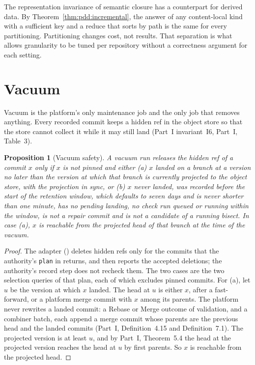\documentclass[11pt,letterpaper]{article}
\newtheorem{proposition}[theorem]{Proposition}
\theoremstyle{definition}
\theoremstyle{remark}
\DeclareRobustCommand{\code}[1]{{\def\_{\textunderscore\allowbreak}\texttt{#1}}}
\begin{document}
The representation invariance of semantic closure has a counterpart for derived data. By Theorem~\ref{thm:pdd:incremental}, the answer of any content-local kind with a sufficient key and a reduce that sorts by path is the same for every partitioning. Partitioning changes cost, not results. That separation is what allows granularity to be tuned per repository without a correctness argument for each setting.

\section{Vacuum}
\label{sec:pdd:vacuum}

Vacuum is the platform's only maintenance job and the only job that removes anything. Every recorded commit keeps a hidden ref  in the object store so that the store cannot collect it while it may still land (Part~I invariant~I6, Part~I, Table~3).

\begin{proposition}[Vacuum safety]
\label{prop:pdd:vacuum}
A vacuum run releases the hidden ref of a commit $x$ only if $x$ is not pinned and either (a) $x$ landed on a branch at a version no later than the version at which that branch is currently projected to the object store, with the projection in sync, or (b) $x$ never landed, was recorded before the start of the retention window, which defaults to seven days and is never shorter than one minute, has no pending landing, no check run queued or running within the window, is not a repair commit and is not a candidate of a running bisect. In case (a), $x$ is reachable from the projected head of that branch at the time of the vacuum.
\end{proposition}

\begin{proof}
The adapter () deletes hidden refs only for the commits that the authority's \code{plan} in  returns, and then reports the accepted deletions; the authority's record step does not recheck them. The two cases are the two selection queries of that plan, each of which excludes pinned commits. For (a), let $u$ be the version at which $x$ landed. The head at $u$ is either $x$, after a fast-forward, or a platform merge commit with $x$ among its parents. The platform never rewrites a landed commit: a Rebase or Merge outcome of validation, and a combiner batch, each append a merge commit whose parents are the previous head and the landed commits (Part~I, Definition~4.15 and Definition~7.1). The projected version is at least $u$, and by Part~I, Theorem~5.4 the head at the projected version reaches the head at $u$ by first parents. So $x$ is reachable from the projected head.
\end{proof}
\end{document}
